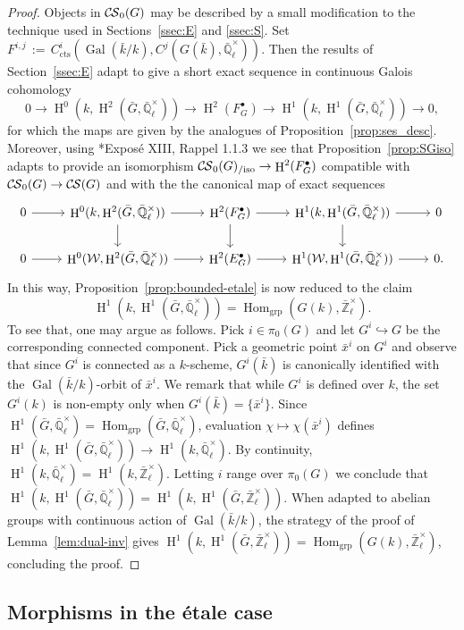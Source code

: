 \documentclass[10pt]{amsart}
\theoremstyle{plain}
\theoremstyle{definition}
\newcommand{\EE}{\mathbb{\bar Q}_\ell}
\newcommand{\bFq}{\bar{k}}
\newcommand{\Fq}{k}
\newcommand{\EEx}{\EE^\times}
\newcommand{\ZEx}{\mathbb{\bar Z}_\ell^\times}
\newcommand{\Weil}[1]{\mathcal{W}_{#1}}
\DeclareMathOperator{\Gal}{Gal}
\DeclareMathOperator{\Hom}{Hom}
\DeclareMathOperator{\Hh}{H}
\newcommand{\ceq}{{\, :=\, }}
\newcommand{\CS}{{\mathcal{C\hskip-0.8pt S}}}
\newcommand{\bCS}{{\CS_0}}
\newcommand{\bCSiso}[1]{\bCS(#1)_{/\text{iso}}}
\newcommand{\bG}{\bar{G}}
\begin{document}
\begin{proof}
Objects in $\bCS(G)$ may be described by a small modification to the technique used in Sections~\ref{ssec:E} and \ref{ssec:S}. 
Set $F^{i,j} \ceq C^i_{\text{cts}} (\Gal(\bFq/\Fq), C^j(G(\bFq), \EEx))$.
Then the results of Section~\ref{ssec:E} adapt to give a short exact sequence in continuous Galois cohomology
 \[
    0 \to
    \Hh^0(\Fq,\Hh^2(\bG,\EEx)) \to
    \Hh^2(F^\bullet_G) \to
    \Hh^1(\Fq,\Hh^1(\bG,\EEx)) \to
    0,
 \]
for which the maps are given by the analogues of Proposition~\ref{prop:ses_desc}.
Moreover, using \cite{deligne-katz:SGA7.2}*{Expos\'e XIII, Rappel 1.1.3} we see that Proposition~\ref{prop:SGiso} adapts to provide an isomorphism $\bCSiso{G}\to \Hh^2(F^\bullet_G)$ compatible with $\bCS(G) \to \CS(G)$ and with the
the canonical map of exact sequences 
 \[
\begin{tikzcd}
    0 \arrow{r} &
    \Hh^0(\Fq,\Hh^2(\bG,\EEx)) \arrow{r} \arrow{d} &
    \Hh^2(F^\bullet_G) \arrow{r} \arrow{d} &
    \Hh^1(\Fq,\Hh^1(\bG,\EEx)) \arrow{r} \arrow{d} &
    0
\\
    0 \arrow{r} & 
    \Hh^0(\Weil{},\Hh^2(\bG,\EEx)) \arrow{r} & 
    \Hh^2(E^\bullet_G) \arrow{r} & 
    \Hh^1(\Weil{},\Hh^1(\bG,\EEx)) \arrow{r} &
    0.
\end{tikzcd}
 \]
In this way, Proposition~\ref{prop:bounded-etale} is now reduced to the claim
\[
\Hh^1(\Fq,\Hh^1(\bG,\EEx)) = \Hom_\text{grp}(G(\Fq),\ZEx).
\]
To see that, one may argue as follows. 
Pick $i\in \pi_0(G)$ and let $G^i \hookrightarrow G$ be the corresponding connected component. 
Pick a geometric point ${\bar x}^i$ on $G^i$ and observe that since $G^i$ is connected as a $\Fq$-scheme, $G^i(\bFq)$ is canonically identified with the $\Gal(\bFq/\Fq)$-orbit of ${\bar x}^i$. 
We remark that while $G^i$ is defined over $\Fq$, the set $G^i(\Fq)$ is non-empty only when $G^i(\bFq) = \{ {\bar x}^i\}$.
Since $\Hh^1(\bG,\EEx) = \Hom_\text{grp}(\bG,\EEx)$, evaluation $\chi \mapsto \chi({\bar x}^i)$ defines $\Hh^1(\Fq,\Hh^1(\bG,\EEx)) \to \Hh^1(\Fq,\EEx)$. 
By continuity, $\Hh^1(\Fq,\EEx) = \Hh^1(\Fq,\ZEx)$.
Letting $i$ range over $\pi_0(G)$ we conclude that $\Hh^1(\Fq,\Hh^1(\bG,\EEx)) = \Hh^1(\Fq,\Hh^1(\bG,\ZEx))$.
When adapted to abelian groups with continuous action of $\Gal(\bFq/\Fq)$, the strategy of the proof of Lemma~\ref{lem:dual-inv} gives $\Hh^1(\Fq,\Hh^1(\bG,\ZEx)) =  \Hom_\text{grp}(G(\Fq),\ZEx)$, concluding the proof.
\end{proof}

\subsection{Morphisms in the \'etale case}\label{ssec:mor-etale}
\end{document}
